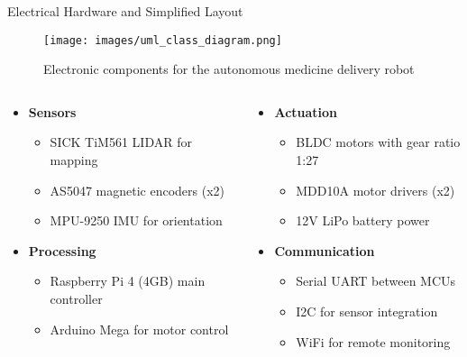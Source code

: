 \documentclass[aspectratio=169]{beamer}
\begin{document}
\begin{frame}{Electrical Hardware and Simplified Layout}
	\begin{figure}
		\centering
		\texttt{[image: images/uml\_class\_diagram.png]}
		\caption{Electronic components for the autonomous medicine delivery robot}
	\end{figure}

	\vspace{0.2cm}

	\begin{columns}
		\begin{column}{0.48\textwidth}
			\begin{itemize}
				\item \textbf{Sensors}
				      \begin{itemize}
					      \item SICK TiM561 LIDAR for mapping
					      \item AS5047 magnetic encoders (x2)
					      \item MPU-9250 IMU for orientation
				      \end{itemize}
				\item \textbf{Processing}
				      \begin{itemize}
					      \item Raspberry Pi 4 (4GB) main controller
					      \item Arduino Mega for motor control
				      \end{itemize}
			\end{itemize}
		\end{column}
		\begin{column}{0.52\textwidth}
			\begin{itemize}
				\item \textbf{Actuation}
				      \begin{itemize}
					      \item BLDC motors with gear ratio 1:27
					      \item MDD10A motor drivers (x2)
					      \item 12V LiPo battery power
				      \end{itemize}
				\item \textbf{Communication}
				      \begin{itemize}
					      \item Serial UART between MCUs
					      \item I2C for sensor integration
					      \item WiFi for remote monitoring
				      \end{itemize}
			\end{itemize}
		\end{column}
	\end{columns}
\end{frame}
\end{document}
